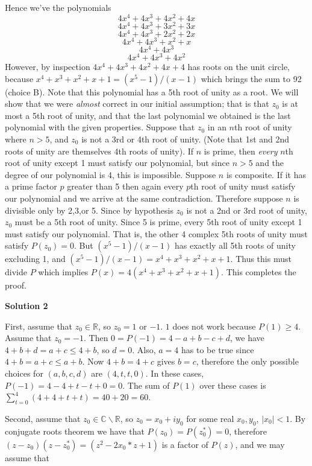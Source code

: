 \begin{enumerate}
 Hence we've the polynomials
 \[4x^4+4x^3+4x^2+4x\]
 \[4x^4+4x^3+3x^2+3x\]
 \[4x^4+4x^3+2x^2+2x\]
 \[4x^4+4x^3+x^2+x\]
 \[4x^4+4x^3\]
 \[4x^4+4x^3+4x^2\]However, by inspection $4x^4+4x^3+4x^2+4x+4$ has roots on the unit circle, because $x^4+x^3+x^2+x+1=(x^5-1)/(x-1)$ which brings the sum to 92 (choice B).  Note that this polynomial has a 5th root of unity as a root. We will show that we were \textit{almost} correct in our initial assumption; that is that $z_0$ is at most a 5th root of unity, and that the last polynomial we obtained is the last polynomial with the given properties. Suppose that $z_0$ in an $n$th root of unity where $n>5$, and $z_0$ is not a 3rd or 4th root of unity. (Note that 1st and 2nd roots of unity are themselves 4th roots of unity). If $n$ is prime, then \textit{every} $n$th root of unity except 1 must satisfy our polynomial, but since $n>5$ and the degree of our polynomial is 4, this is impossible. Suppose $n$ is composite. If it has a prime factor $p$ greater than 5 then again every $p$th root of unity must satisfy our polynomial and we arrive at the same contradiction. Therefore suppose $n$ is divisible only by 2,3,or 5. Since by hypothesis $z_0$ is not a 2nd or 3rd root of unity, $z_0$ must be a 5th root of unity. Since 5 is prime, every 5th root of unity except 1 must satisfy our polynomial. That is, the other 4 complex 5th roots of unity must satisfy $P(z_0)=0$. But $(x^5-1)/(x-1)$ has exactly all 5th roots of unity excluding 1, and $(x^5-1)/(x-1)=x^4+x^3+x^2+x+1$. Thus this must divide $P$ which implies $P(x)=4(x^4+x^3+x^2+x+1)$. This completes the proof.

 



\textbf{Solution 2}

First, assume that $z_0\in \mathbb{R}$, so $z_0=1$ or $-1$. $1$ does not work because $P(1)\geq 4$. Assume that $z_0=-1$. Then $0=P(-1)=4-a+b-c+d$,  we have $4+b+d=a+c\leq 4+b$, so $d=0$. Also, $a=4$ has to be true since $4+b=a+c \leq a+b$. Now $4+b=4+c$ gives $b=c$, therefore the only possible choices for $(a,b,c,d)$ are $(4,t,t,0)$. In these cases, $P(-1)=4-4+t-t+0=0$. The sum of $P(1)$ over these cases is $\sum_{t=0}^{4} (4+4+t+t) = 40+20=60$.

 Second, assume that $z_0\in \mathbb{C} \backslash \mathbb{R}$, so $z_0=x_0+iy_0$ for some real $x_0, y_0$, $|x_0|<1$. By conjugate roots theorem we have that $P(z_0)=P(z_0^{*})=0$, therefore $(z-z_0)(z-z_0^{*}) = (z^2 - 2x_0*z + 1)$ is a factor of $P(z)$, and we may assume that 


\end{enumerate}
